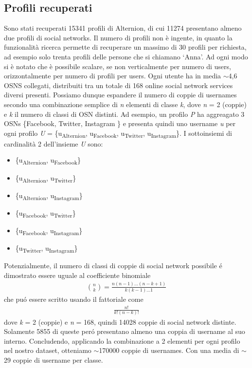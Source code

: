 \subsection{Profili recuperati}
Sono stati recuperati 15341 profili di Alternion, di cui 11274 presentano almeno due profili di social networks. Il numero di profili non è ingente, in quanto la funzionalità ricerca permette di recuperare un massimo di 30 profili per richiesta, ad esempio solo trenta profili delle persone che si chiamano `Anna'. Ad ogni modo si è notato che è possibile scalare, se non verticalmente per numero di users, orizzontalmente per numero di profili per users. Ogni utente ha in media $\sim$4,6 OSNS collegati, distribuiti tra un totale di 168 online social network services diversi presenti. Possiamo dunque espandere il numero di coppie di usernames secondo una combinazione semplice di \textit{n} elementi di classe \textit{k}, dove \textit{n} = 2 (coppie) e \textit{k} il numero di classi di OSN distinti. Ad esempio, un profilo \textit{P} ha aggreagato 3 OSNs \{Facebook, Twitter, Instagram \} e presenta quindi uno username \textit{u} per ogni profilo
\textit{U} = \{u\textsubscript{Alternion}, u\textsubscript{Facebook}, u\textsubscript{Twitter}, u\textsubscript{Instagram}\}. I sottoinsiemi di cardinalità 2 dell'insieme \textit{U} sono:
\begin{itemize}
  \item \{u\textsubscript{Alternion}, u\textsubscript{Facebook}\}
  \item \{u\textsubscript{Alternion}, u\textsubscript{Twitter}\}
  \item \{u\textsubscript{Alternion}, u\textsubscript{Instagram}\}
  \item \{u\textsubscript{Facebook}, u\textsubscript{Twitter}\}
  \item \{u\textsubscript{Facebook}, u\textsubscript{Instagram}\}
  \item \{u\textsubscript{Twitter}, u\textsubscript{Instagram}\}
\end{itemize}
Potenzialmente, il numero di classi di coppie di social network possibile é dimostrato essere uguale al coefficiente binomiale
\begin{gather*}
  \binom nk = \frac{n(n-1)\ldots(n-k+1)}{k(k-1)\dots1}
\end{gather*}
che puó essere scritto usando il fattoriale come
\begin{gather*}
  \frac{n!}{k!(n-k)!}
\end{gather*}
dove \textit{k} = 2 (coppie) e \textit{n} = 168, quindi 14028 coppie di social network distinte. Solamente 5855 di queste peró presentano almeno una coppia di username al suo interno. Concludendo, applicando la combinazione a 2 elementi per ogni profilo nel nostro dataset, otteniamo $\sim$170000 coppie di usernames. Con una media di $\sim$29 coppie di username per classe.
